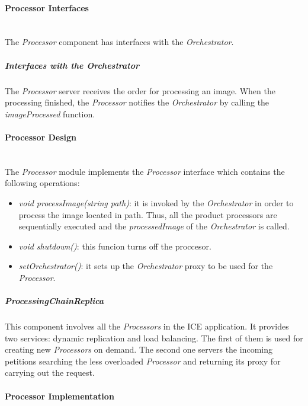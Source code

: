 \paragraph{ Processor Interfaces}~\\

The \emph{Processor} component has interfaces with the \emph{Orchestrator}.

\subparagraph{Interfaces with the Orchestrator}

The \emph{Processor} server receives the order for processing an image. When the
processing finished, the \emph{Processor} notifies the \emph{Orchestrator} by
calling the \emph{imageProcessed} function.

\paragraph{ Processor Design}~\\

The \emph{Processor} module implements the \emph{Processor} interface which
contains the following operations:

\begin{itemize}
\item \emph{void processImage(string path)}: it is invoked by the
  \emph{Orchestrator} in order to process the image located in path. Thus, all
  the product processors are sequentially executed and the \emph{processedImage}
  of the \emph{Orchestrator} is called. 
\item \emph{void shutdown()}: this funcion turns off the proccesor.
\item \emph{setOrchestrator()}: it sets up the \emph{Orchestrator} proxy to be
  used for the \emph{Processor}.
\end{itemize}

\subparagraph{ProcessingChainReplica}

This component involves all the \emph{Processors} in the ICE application. It
provides two services: dynamic replication and load balancing. The first
of them is used for creating new \emph{Processors} on demand. The second one 
servers the incoming petitions searching the less overloaded \emph{Processor}
and returning its proxy for carrying out the request.

\paragraph{ Processor Implementation}~\\

